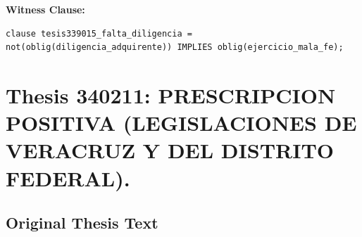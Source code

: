 \documentclass[11pt,a4paper]{article}
\begin{document}
\textbf{Witness Clause:}

\begin{lstlisting}[style=witnessstyle, language=Witness]
clause tesis339015_falta_diligencia = not(oblig(diligencia_adquirente)) IMPLIES oblig(ejercicio_mala_fe);
\end{lstlisting}

\newpage

\section{Thesis 340211: PRESCRIPCION POSITIVA (LEGISLACIONES DE VERACRUZ Y DEL DISTRITO FEDERAL).}
\label{thesis:340211}

\subsection{Original Thesis Text}
\end{document}
